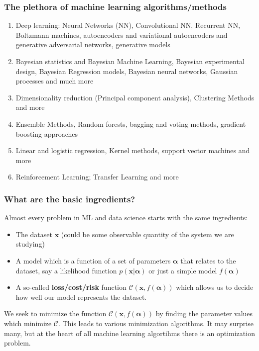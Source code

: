 \documentclass{beamer}
\begin{document}
\begin{frame}
\frametitle{The plethora  of machine learning algorithms/methods}

\begin{enumerate}
\item Deep learning: Neural Networks (NN), Convolutional NN, Recurrent NN, Boltzmann machines, autoencoders and variational autoencoders  and generative adversarial networks, generative models 

\item Bayesian statistics and Bayesian Machine Learning, Bayesian experimental design, Bayesian Regression models, Bayesian neural networks, Gaussian processes and much more

\item Dimensionality reduction (Principal component analysis), Clustering Methods and more

\item Ensemble Methods, Random forests, bagging and voting methods, gradient boosting approaches 

\item Linear and logistic regression, Kernel methods, support vector machines and more

\item Reinforcement Learning; Transfer Learning and more 
\end{enumerate}

\noindent
\end{frame}

\begin{frame}
\frametitle{What are the basic ingredients?}

\begin{block}{}
Almost every problem in ML and data science starts with the same ingredients:
\begin{itemize}
\item The dataset $\mathbf{x}$ (could be some observable quantity of the system we are studying)

\item A model which is a function of a set of parameters $\mathbf{\alpha}$ that relates to the dataset, say a likelihood  function $p(\mathbf{x}\vert \mathbf{\alpha})$ or just a simple model $f(\mathbf{\alpha})$

\item A so-called \textbf{loss/cost/risk} function $\mathcal{C} (\mathbf{x}, f(\mathbf{\alpha}))$ which allows us to decide how well our model represents the dataset. 
\end{itemize}

\noindent
We seek to minimize the function $\mathcal{C} (\mathbf{x}, f(\mathbf{\alpha}))$ by finding the parameter values which minimize $\mathcal{C}$. This leads to  various minimization algorithms. It may surprise many, but at the heart of all machine learning algortihms there is an optimization problem. 
\end{block}
\end{frame}
\end{document}
